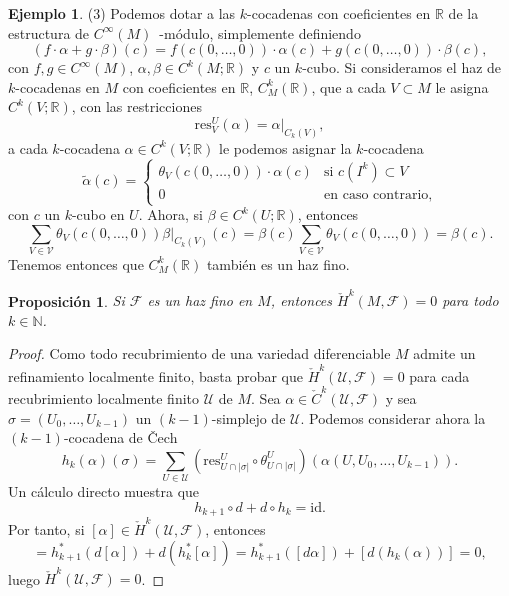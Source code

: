 \documentclass[12pt,a4paper]{book}
\newtheorem{prop}[thm]{Proposición}
\theoremstyle{definition} \newtheorem{defn}[thm]{Definición}
\theoremstyle{definition} \newtheorem{ejemplo}[thm]{Ejemplo}
\theoremstyle{definition} \newtheorem{ejercicio}[thm]{Ejercicio}
\theoremstyle{remark} \newtheorem*{obs}{Observación}
\def\RR{\mathbb{R}}
\def\NN{\mathbb{N}}
\def\id{\mathrm{id}}
\def\FF{\mathscr{F}}
\begin{document}
\begin{ejemplo}
		(3) Podemos dotar a las $k$-cocadenas con coeficientes en $\RR$ de la estructura de $C^\infty(M)$~-módulo, simplemente definiendo
  \begin{equation*}
    (f\cdot \alpha + g\cdot \beta)(c)=f(c(0,\dots,0)) \cdot \alpha(c) + g(c(0,\dots,0)) \cdot \beta(c),
  \end{equation*}
  con $f,g\in C^\infty(M)$, $\alpha, \beta \in C^k(M;\RR)$ y $c$ un $k$-cubo.
  Si consideramos el haz de $k$-cocadenas en $M$ con coeficientes en $\RR$, $C^k_M(\RR)$, que a cada $V \subset M$ le asigna $C^k(V;\RR)$, con las restricciones $$\mathrm{res}^U_V (\alpha)=\alpha|_{C_k(V)},$$ a cada $k$-cocadena $\alpha \in C^k(V;\RR)$ le podemos asignar la $k$-cocadena
  \begin{equation*}
    \tilde{\alpha}(c)=
    \begin{cases}
      \theta_V(c(0,\dots,0)) \cdot \alpha(c) &\text{si } c(I^k) \subset V\\
      0 &\text{en caso contrario},
    \end{cases}
  \end{equation*}
  con $c$ un $k$-cubo en $U$. Ahora, si $\beta \in C^k(U;\RR)$, entonces
  \begin{equation*}
    \sum_{V\in \mathcal{V}}\theta_V(c(0,\dots,0)) \beta|_{C_k(V)}(c)=\beta(c) \sum_{V\in \mathcal{V}}\theta_V(c(0,\dots,0)) = \beta(c).
  \end{equation*}
  Tenemos entonces que $C^k_M(\RR)$ también es un haz fino.
	  \end{ejemplo}
	  \begin{prop}
	    Si $\FF$ es un haz fino en $M$, entonces $\check{H}^k(M,\FF)=0$ para todo $k\in \NN$.
	  \end{prop}
	  \begin{proof}
	    Como todo recubrimiento de una variedad diferenciable $M$ admite un refinamiento localmente finito, basta probar que $\check{H}^k(\mathcal{U},\FF)=0$ para cada recubrimiento localmente finito $\mathcal{U}$ de $M$. Sea $\alpha \in \check{C}^k(\mathcal{U},\FF)$ y sea $\sigma=(U_0,\dots,U_{k-1})$ un $(k-1)$-simplejo de $\mathcal{U}$. Podemos considerar ahora la $(k-1)$-cocadena de \v{C}ech 
	    \begin{equation*}
	      h_k(\alpha)(\sigma)=\sum_{U\in\mathcal{U}}\left(\mathrm{res}^U_{U\cap|\sigma|}\circ \theta^U_{U\cap |\sigma|}\right)(\alpha(U,U_0,\dots,U_{k-1})).
	    \end{equation*}
	    Un cálculo directo muestra que
	    \begin{equation*}
	       h_{k+1}\circ d +d\circ h_k = \id.
	    \end{equation*}
	    Por tanto, si $[\alpha]\in \check{H}^k(\mathcal{U},\FF)$, entonces
	    \begin{equation*}
	[\alpha]=    h^*_{k+1}(d[\alpha])+d(h^*_k[\alpha])= h^*_{k+1}([d\alpha])+[d(h_k(\alpha))]=0,
	    \end{equation*}
	    luego $\check{H}^k(\mathcal{U},\FF)=0$.
	  \end{proof}
\end{document}
